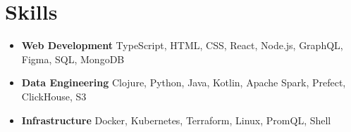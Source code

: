 \documentclass[letterpaper,11pt]{article}
\newcommand{\resumeItem}[2]{
  \item\small{
    \textbf{#1}{ #2 \vspace{-2pt}}
  }
}
\newcommand{\resumeSubItem}[2]{\resumeItem{#1}{#2}\vspace{-4pt}}
\newcommand{\resumeSubHeadingListStart}{\begin{itemize}[leftmargin=*]}
\newcommand{\resumeSubHeadingListEnd}{\end{itemize}}
\begin{document}
\section{Skills}
 \resumeSubHeadingListStart
    \resumeSubItem{Web Development}
      {TypeScript, HTML, CSS, React, Node.js, GraphQL, Figma, SQL, MongoDB}
    \resumeSubItem{Data Engineering}
      {Clojure, Python, Java, Kotlin, Apache Spark, Prefect, ClickHouse, S3}
    \resumeSubItem{Infrastructure}
      {Docker, Kubernetes, Terraform, Linux, PromQL, Shell}
 \resumeSubHeadingListEnd
\end{document}
